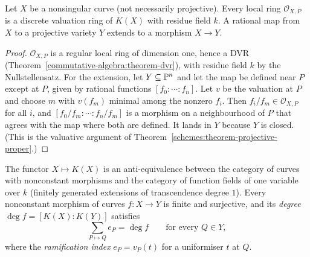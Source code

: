 \begin{proposition}\label{curves:proposition-dvr}
Let $X$ be a nonsingular curve (not necessarily projective). Every local ring $\mathcal{O}_{X,P}$ is a discrete valuation ring of $K(X)$ with residue field $k$. A rational map
from $X$ to a projective variety $Y$ extends to a morphism $X \to Y$.
\end{proposition}

\begin{proof}
$\mathcal{O}_{X,P}$ is a regular local ring of dimension one, hence a DVR (Theorem~\ref{commutative-algebra:theorem-dvr}), with residue field $k$ by the Nullstellensatz. For
the extension, let $Y \subseteq \mathbb{P}^n$ and let the map be defined near $P$ except at $P$, given by rational functions $[f_0 : \cdots : f_n]$. Let $v$ be the valuation at $P$
and choose $m$ with $v(f_m)$ minimal among the nonzero $f_i$. Then $f_i/f_m \in \mathcal{O}_{X,P}$ for all $i$, and $[f_0/f_m : \cdots : f_n/f_m]$ is a morphism on a neighbourhood of
$P$ that agrees with the map where both are defined. It lands in $Y$ because $Y$ is closed. (This is the valuative argument of Theorem~\ref{schemes:theorem-projective-proper}.)
\end{proof}

\begin{theorem}\label{curves:theorem-function-fields}
The functor $X \mapsto K(X)$ is an anti-equivalence between the category of curves with nonconstant morphisms and the category of function fields of one variable over
$k$ (finitely generated extensions of transcendence degree $1$). Every nonconstant morphism of curves $f \colon X \to Y$ is finite and surjective, and its \emph{degree}
$\deg f = [K(X) : K(Y)]$ satisfies
\[
\sum_{P \mapsto Q}e_P = \deg f \qquad\text{for every } Q \in Y,
\]
where the \emph{ramification index} $e_P = v_P(t)$ for a uniformiser $t$ at $Q$.
\end{theorem}

